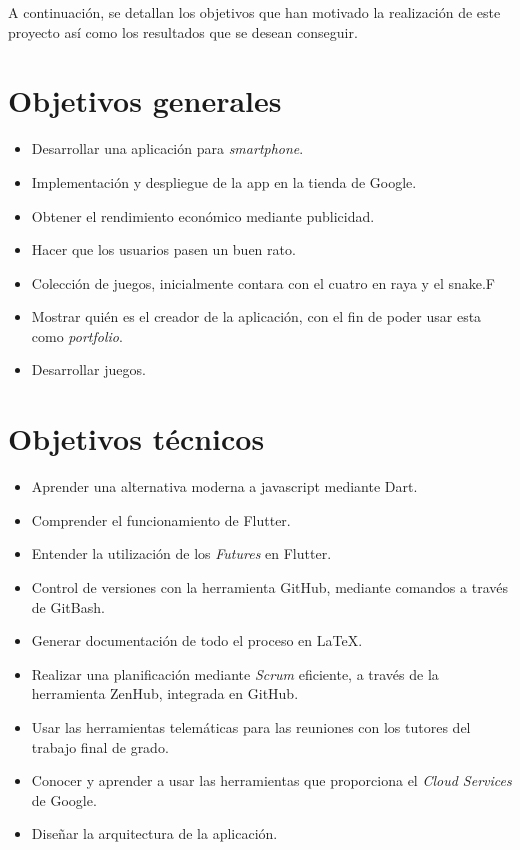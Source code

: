 

A continuación, se detallan los objetivos que han motivado la realización de este proyecto así como los resultados que se desean conseguir.

\section{Objetivos generales}
\begin{itemize}
	\item Desarrollar una aplicación para \emph{smartphone}.
	\item Implementación y despliegue de la app en la tienda de Google.
	\item Obtener el rendimiento económico mediante publicidad.
	\item Hacer que los usuarios pasen un buen rato.
	\item Colección de juegos, inicialmente contara con el cuatro en raya y el snake.F
	\item Mostrar quién es el creador de la aplicación, con el fin de poder usar esta como \emph{portfolio}.
	\item Desarrollar juegos.
\end{itemize}

\section{Objetivos técnicos}
\begin{itemize}
	\item Aprender una alternativa moderna a javascript mediante Dart.
	\item Comprender el funcionamiento de Flutter.
	\item Entender la utilización de los \emph{Futures} en Flutter.
	\item Control de versiones con la herramienta GitHub, mediante comandos a través de GitBash.
	\item Generar documentación de todo el proceso en \LaTeX.
	\item Realizar una planificación mediante \emph{Scrum} eficiente, a través de la herramienta ZenHub, integrada en GitHub.
	\item Usar las herramientas telemáticas para las reuniones con los tutores del trabajo final de grado. 
	\item Conocer y aprender a usar las herramientas que proporciona el \emph{Cloud Services} de Google.
	\item Diseñar la arquitectura de la aplicación.
	
\end{itemize}

